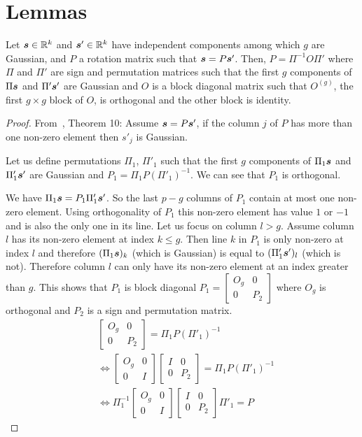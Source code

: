 \section{Lemmas}
\begin{lemma}
\label{lemma:ica}
Let $\boldsymbol{s} \in \mathbb{R}^k$ and $\boldsymbol{s}'\in \mathbb{R}^k$ have independent components among which $g$ are Gaussian, and $P$ a rotation matrix such that $\boldsymbol{s} = P\boldsymbol{s}'$. Then, $P=\Pi^{-1} O \Pi'$ where $\Pi$ and $\Pi'$ are sign and permutation matrices such that the first $g$ components of $\Pi \boldsymbol{s}$ and $\Pi' \boldsymbol{s}'$ are Gaussian and $O$ is a block diagonal matrix such that $O^{(g)}$, the first $g \times g$ block of $O$, is orthogonal and the other block is identity.
\end{lemma}
\begin{proof}
  From~\cite{comon1994independent}, Theorem 10:
  Assume $\boldsymbol{s} = P\boldsymbol{s}'$, if the column $j$ of $P$ has more than one non-zero element then $s'_j$ is Gaussian. 
  
  Let us define permutations $\Pi_1$, $\Pi'_1$ such that the first $g$ components of $\Pi_1 \boldsymbol{s}$ and $\Pi'_1 \boldsymbol{s}'$ are Gaussian and $P_1  = \Pi_1 P (\Pi'_1)^{-1}$. We can see that $P_1$ is orthogonal.
  
  We have $\Pi_1 \boldsymbol{s} = P_1 \Pi'_1 \boldsymbol{s}'$. So the last $p-g$ columns of $P_1$ contain at most one non-zero element. Using orthogonality of $P_1$ this non-zero element has value $1$ or $-1$ and is also the only one in its line. Let us focus on column $l > g$. Assume column $l$ has its non-zero element at index $k \leq g$. Then line $k$ in $P_1$ is only non-zero at index $l$ and therefore $(\Pi_1 \boldsymbol{s})_k$ (which is Gaussian) is equal to $(\Pi'_1 \boldsymbol{s}')_l$ (which is not). Therefore column $l$ can only have its non-zero element at an index greater than $g$. This shows that $P_1$ is block diagonal $P_1 = \begin{bmatrix} O_g & 0 \\ 0 & P_2 \end{bmatrix}$ where $O_g$ is orthogonal  and $P_2$ is a sign and permutation matrix.
  \begin{align}
      &\begin{bmatrix} O_g & 0 \\ 0 & P_2 \end{bmatrix} = \Pi_1 P (\Pi'_1)^{-1} \\
      & \iff \begin{bmatrix} O_g & 0 \\ 0 & I \end{bmatrix} \begin{bmatrix} I & 0 \\ 0 & P_2 \end{bmatrix}  = \Pi_1 P (\Pi'_1)^{-1} \\
      & \iff \Pi_1^{-1} \begin{bmatrix} O_g & 0 \\ 0 & I \end{bmatrix} \begin{bmatrix} I & 0 \\ 0 & P_2 \end{bmatrix} \Pi'_1  = P
  \end{align}
  

\end{proof}
